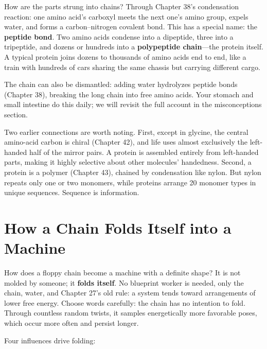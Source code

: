 How are the parts strung into chains? Through Chapter 38's condensation reaction: one amino acid's carboxyl meets the next one's amino group, expels water, and forms a carbon--nitrogen covalent bond. This has a special name: the \textbf{peptide bond}. Two amino acids condense into a dipeptide, three into a tripeptide, and dozens or hundreds into a \textbf{polypeptide chain}---the protein itself. A typical protein joins dozens to thousands of amino acids end to end, like a train with hundreds of cars sharing the same chassis but carrying different cargo.

The chain can also be dismantled: adding water hydrolyzes peptide bonds (Chapter 38), breaking the long chain into free amino acids. Your stomach and small intestine do this daily; we will revisit the full account in the misconceptions section.

Two earlier connections are worth noting. First, except in glycine, the central amino-acid carbon is chiral (Chapter 42), and life uses almost exclusively the left-handed half of the mirror pairs. A protein is assembled entirely from left-handed parts, making it highly selective about other molecules' handedness. Second, a protein is a polymer (Chapter 43), chained by condensation like nylon. But nylon repeats only one or two monomers, while proteins arrange 20 monomer types in unique sequences. Sequence is information.

\section{How a Chain Folds Itself into a Machine}

How does a floppy chain become a machine with a definite shape? It is not molded by someone; it \textbf{folds itself}. No blueprint worker is needed, only the chain, water, and Chapter 27's old rule: a system tends toward arrangements of lower free energy. Choose words carefully: the chain has no intention to fold. Through countless random twists, it samples energetically more favorable poses, which occur more often and persist longer.

Four influences drive folding:

